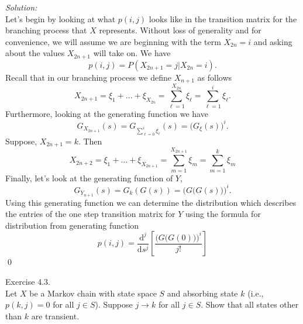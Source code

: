 \documentclass[10pt]{amsart}
\newcommand{\D}{\mathrm{d}}
\begin{document}
\begin{enumerate}[(a)]
\noindent
\textit{Solution:} \\ 
Let's begin by looking at what $p(i, j)$ looks like in the transition matrix for the branching process that $X$ represents.
Without loss of generality and for convenience, we will assume we are beginning with the term $X_{2n} = i$ and asking about the values $X_{2n + 1}$ will take on.
We have
$$
p(i,j) = P(X_{2n + 1} = j | X_{2n} = i).
$$
Recall that in our branching process we define $X_{n + 1}$ as follows
$$
X_{2n+1} = \xi_1 + ... + \xi_{X_{2n}} = \sum_{\ell = 1}^{X_{2n}} \xi_\ell =  \sum_{\ell = 1}^i \xi_\ell.
$$
Furthermore, looking at the generating function we have
$$
G_{X_{2n + 1}}(s) = G_{\sum_{\ell = 0}^i \xi_\ell}(s) = \big(G_\xi(s)\big)^i.
$$
Suppose, $X_{2n+1} = k$.
Then
$$
X_{2n+2} = \xi_1 + \dots + \xi_{X_{2n + 1}} = \sum_{m = 1}^{X_{2n + 1}} \xi_m = \sum_{m = 1}^k \xi_m
$$
Finally, let's look at the generating function of $Y$,
$$
G_{Y_{n + 1}}(s) = G_{k}(G(s)) = \Big( G\big(G(s)\big) \Big)^i.
$$
Using this generating function we can determine the distribution which describes the entries of the one step transition matrix for $Y$ using the formula for distribution from generating function
$$
p(i,j) = \frac {\D^j}{\D s^j} \left[ \frac {\Big( G\big(G(0)\big) \Big)^i}{j!} \right]
$$
\qed \\

\end{enumerate}
\newpage


 Exercise 4.3. \\
Let $X$ be a Markov chain with state space $S$ and absorbing state $k$ (i.e., $p(k, j) = 0$ for all $j \in S$).
Suppose $j \rightarrow k$ for all $j \in S$.
Show that all states other than $k$ are transient. \\
\end{document}

